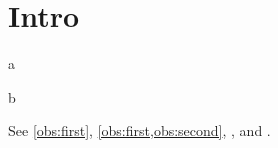 \section{Intro}
\begin{oblemma}\label{obs:first}
a
\end{oblemma}
\begin{oblemma}\label{obs:second}
b
\end{oblemma}
See \autoref{obs:first}, \cref{obs:first,obs:second}, , and .
